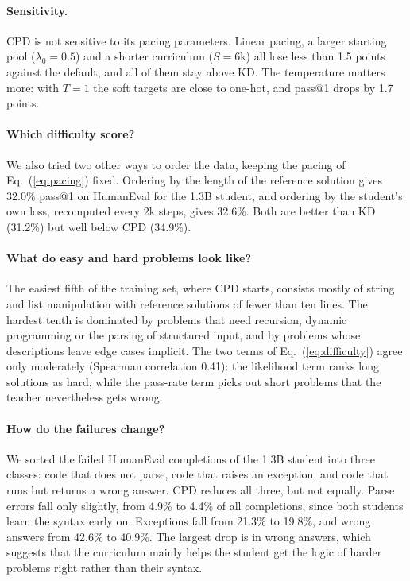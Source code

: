 \documentclass{article} %
\begin{document}
\paragraph{Sensitivity.}
CPD is not sensitive to its pacing parameters.
Linear pacing, a larger starting pool ($\lambda_0 = 0.5$) and a shorter curriculum ($S = 6$k) all lose less than 1.5 points against the default, and all of them stay above KD.
The temperature matters more: with $T = 1$ the soft targets are close to one-hot, and pass@1 drops by 1.7 points.

\paragraph{Which difficulty score?}
We also tried two other ways to order the data, keeping the pacing of Eq.~(\ref{eq:pacing}) fixed.
Ordering by the length of the reference solution gives 32.0\% pass@1 on HumanEval for the 1.3B student, and ordering by the student's own loss, recomputed every 2k steps, gives 32.6\%.
Both are better than KD (31.2\%) but well below CPD (34.9\%).

\paragraph{What do easy and hard problems look like?}
The easiest fifth of the training set, where CPD starts, consists mostly of string and list manipulation with reference solutions of fewer than ten lines.
The hardest tenth is dominated by problems that need recursion, dynamic programming or the parsing of structured input, and by problems whose descriptions leave edge cases implicit.
The two terms of Eq.~(\ref{eq:difficulty}) agree only moderately (Spearman correlation 0.41): the likelihood term ranks long solutions as hard, while the pass-rate term picks out short problems that the teacher nevertheless gets wrong.

\paragraph{How do the failures change?}
We sorted the failed HumanEval completions of the 1.3B student into three classes: code that does not parse, code that raises an exception, and code that runs but returns a wrong answer.
CPD reduces all three, but not equally.
Parse errors fall only slightly, from 4.9\% to 4.4\% of all completions, since both students learn the syntax early on.
Exceptions fall from 21.3\% to 19.8\%, and wrong answers from 42.6\% to 40.9\%.
The largest drop is in wrong answers, which suggests that the curriculum mainly helps the student get the logic of harder problems right rather than their syntax.
\end{document}
